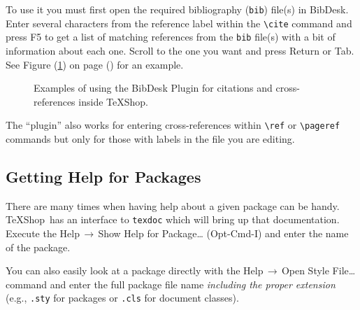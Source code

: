 \documentclass[letterpaper,11pt]{article}
\newcommand{\TS}{\textsf{\TeX Shop}}
\newcommand{\cmd}[1]{\textsf{#1}}
\newcommand{\mnu}[1]{\textsf{#1}}
\newcommand{\To}{\,\(\to\)\,}
\begin{document}
To use it you must first open the required bibliography (\texttt{bib}) file(s) in \cmd{BibDesk}. Enter several characters from the reference label within the \verb|\cite| command and press \cmd{F5} to get a list of matching references from the \texttt{bib} file(s) with a bit of information about each one. Scroll to the one you want and press \cmd{Return} or \cmd{Tab}. See Figure (\ref{fig:bibdesk}) 
on page (\pageref{fig:bibdesk}) for an example.
\begin{figure}
\centering
{}\qquad{}
\caption{Examples of using the \textsf{BibDesk} Plugin for citations and cross-references inside \TS.}
\label{fig:bibdesk}
\end{figure}

The ``plugin'' also works for entering cross-references within \verb|\ref| or \verb|\pageref| commands but only for those with labels in the file you are editing.

\subsection{Getting Help for Packages}

There are many times when having help about a given package can be handy. \TS\ has an interface to \texttt{texdoc} which will bring up that documentation. Execute the \mnu{Help}\To\mnu{Show Help for Package…} (\cmd{Opt-Cmd-I}) and enter the name of the package.

You can also easily look at a package directly with the \mnu{Help}\To\mnu{Open Style File…} command and enter the full package file name \emph{including the proper extension} (e.g., \texttt{.sty} for packages or \texttt{.cls} for document classes).

\end{document}
